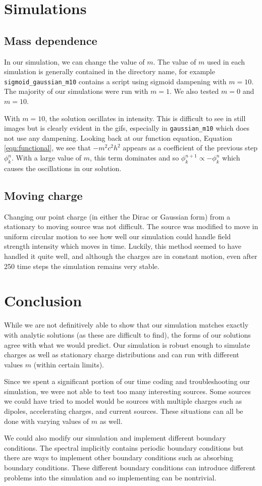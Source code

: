 \documentclass{article}
\begin{document}
	\section{Simulations}
	
	\subsection{Mass dependence}
	In our simulation, we can change the value of $m$. The value of $m$ used in each simulation is generally contained in the directory name, for example \texttt{sigmoid\_gaussian\_m10} contains a script using sigmoid dampening with $m=10$. The majority of our simulations were run with $m=1$. We also tested $m=0$ and $m=10$. 
	
	With $m=10$, the solution oscillates in intensity. This is difficult to see in still images but is clearly evident in the gifs, especially in \texttt{gaussian\_m10} which does not use any dampening. Looking back at our function equation, Equation \ref{eqn:functional}, we see that $-m^2c^2h^2$ appears as a coefficient of the previous step $\phi^n_k$. With a large value of $m$, this term dominates and so $\phi^{n+1}_k\propto-\phi^n_k$ which causes the oscillations in our solution.
	
	\subsection{Moving charge}
	Changing our point charge (in either the Dirac or Gaussian form) from a stationary to moving source was not difficult. The source was modified to move in uniform circular motion to see how well our simulation could handle field strength intensity which moves in time. Luckily, this method seemed to have handled it quite well, and although the charges are in constant motion, even after 250 time steps the simulation remains very stable.
	
	
	\section{Conclusion}
	While we are not definitively able to show that our simulation matches exactly with analytic solutions (as these are difficult to find), the forms of our solutions agree with what we would predict. Our simulation is robust enough to simulate charges as well as stationary charge distributions and can run with different values $m$ (within certain limits). 
	
	Since we spent a significant portion of our time coding and troubleshooting our simulation, we were not able to test too many interesting sources. Some sources we could have tried to model would be sources with multiple charges such as dipoles, accelerating charges, and current sources. These situations can all be done with varying values of $m$ as well.

	We could also modify our simulation and implement different boundary conditions. The spectral implicitly contains periodic boundary conditions but there are ways to implement other boundary conditions such as absorbing boundary conditions. These different boundary conditions can introduce different problems into the simulation and so implementing can be nontrivial.
	
\end{document}
